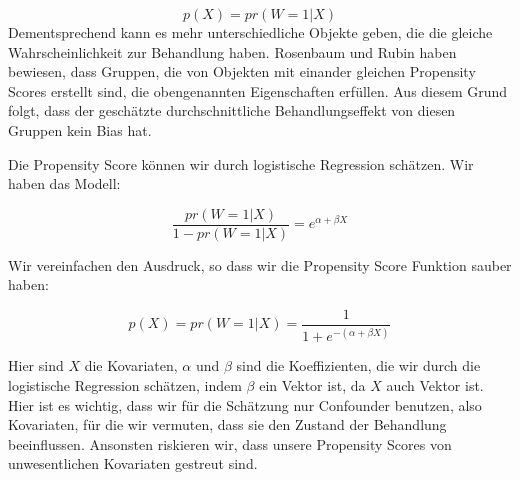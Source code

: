 \documentclass[12pt,a4paper,twoside]{scrartcl}
\numberwithin{equation}{section}
\begin{document}
\begin{equation}\label{eq:2.6}
 p(X) = pr(W=1|X)
\end{equation}
Dementsprechend kann es mehr unterschiedliche Objekte geben, die die gleiche Wahrscheinlichkeit zur Behandlung haben. Rosenbaum und Rubin haben bewiesen, dass Gruppen, die von Objekten mit einander gleichen Propensity Scores erstellt sind, die obengenannten Eigenschaften erfüllen. Aus diesem Grund folgt, dass der geschätzte durchschnittliche Behandlungseffekt von diesen Gruppen kein Bias hat\cite{rosenbaum1983central}. \par 

\noindent 
Die Propensity Score können wir durch logistische Regression schätzen. Wir haben das Modell:\par

\begin{equation}\label{eq:2.7}
  \frac{pr(W=1|X)}{1-pr(W=1|X)} = e^{\alpha+\beta X}
\end{equation}

\noindent
Wir vereinfachen den Ausdruck, so dass wir die Propensity Score Funktion sauber haben:\par

\begin{equation}\label{eq:2.8}
  p(X)= pr(W=1|X) = \frac{1}{1 + e^{-(\alpha+\beta X)}}
\end{equation}

\noindent
Hier sind $X$ die Kovariaten, $\alpha$ und $\beta$ sind die Koeffizienten, die wir durch die logistische Regression schätzen, indem $\beta$ ein Vektor ist, da $X$ auch Vektor ist. Hier ist es wichtig, dass wir für die Schätzung nur Confounder benutzen, also Kovariaten, für die wir vermuten, dass sie den Zustand der Behandlung beeinflussen. Ansonsten riskieren wir, dass unsere Propensity Scores von unwesentlichen Kovariaten gestreut sind.\par 
\end{document}
